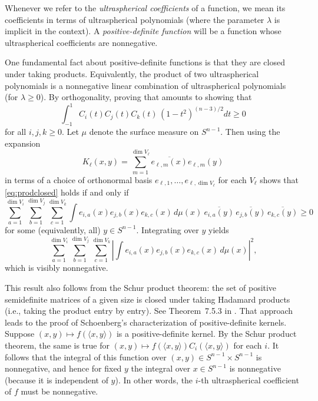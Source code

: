 \documentclass{jams-l}
\theoremstyle{plain}
\numberwithin{theorem}{section}
\theoremstyle{definition}
\numberwithin{equation}{section}
\begin{document}
Whenever we refer to the \textit{ultraspherical coefficients\/} of
a function, we mean its coefficients in terms of ultraspherical
polynomials (where the parameter $\lambda$ is implicit in the
context).  A \textit{positive-definite function\/} will be a
function whose ultraspherical coefficients are nonnegative.

One fundamental fact about positive-definite functions is that
they are closed under taking products.  Equivalently, the product
of two ultraspherical polynomials is a nonnegative linear
combination of ultraspherical polynomials (for $\lambda \ge 0$).
By orthogonality, proving that amounts to showing that
\begin{equation} \label{eq:prodclosed}
\int_{-1}^1 C_i(t) C_j(t) C_k(t) \, (1-t^2)^{(n-3)/2} dt \ge 0
\end{equation}
for all $i,j,k \ge 0$. Let $\mu$ denote the surface measure on
$S^{n-1}$. Then using the expansion
$$
K_\ell(x,y) = \sum_{m=1}^{\dim V_\ell} \overline{e_{\ell,m}(x)}
e_{\ell,m}(y)
$$
in terms of a choice of orthonormal basis
$e_{\ell,1},\dots,e_{\ell,\dim V_\ell}$ for each $V_\ell$ shows
that \eqref{eq:prodclosed} holds if and only if
$$
\sum_{a=1}^{\dim V_i} \sum_{b=1}^{\dim V_j} \sum_{c=1}^{\dim V_k}
\int e_{i,a}(x) e_{j,b}(x) e_{k,c}(x) \, d\mu(x) \
\overline{e_{i,a}(y)} \, \overline{e_{j,b}(y)} \,
\overline{e_{k,c}(y)} \ge 0
$$
for some (equivalently, all) $y \in S^{n-1}$.  Integrating over
$y$ yields
$$
\sum_{a=1}^{\dim V_i} \sum_{b=1}^{\dim V_j} \sum_{c=1}^{\dim V_k}
\left|\int e_{i,a}(x) e_{j,b}(x) e_{k,c}(x) \, d\mu(x)
\right|^2\!\!,
$$
which is visibly nonnegative.

This result also follows from the Schur product theorem: the set
of positive semidefinite matrices of a given size is closed under
taking Hadamard products (i.e., taking the product entry by
entry). See Theorem~7.5.3 in \cite[p.~458]{HJ}.  That approach
leads to the proof of Schoenberg's characterization of
positive-definite kernels.  Suppose $(x,y) \mapsto f(\langle
x,y\rangle)$ is a positive-definite kernel.  By the Schur product
theorem, the same is true for $(x,y) \mapsto f(\langle x,y\rangle)
C_i(\langle x,y\rangle)$ for each $i$.  It follows that the
integral of this function over $(x,y) \in S^{n-1} \times S^{n-1}$
is nonnegative, and hence for fixed $y$ the integral over $x \in
S^{n-1}$ is nonnegative (because it is independent of $y$).  In
other words, the $i$-th ultraspherical coefficient of $f$ must be
nonnegative.
\end{document}
